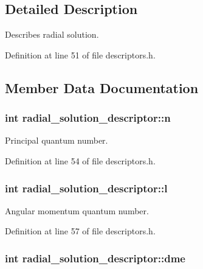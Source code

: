 \subsection{Detailed Description}
Describes radial solution. 

Definition at line 51 of file descriptors.\+h.



\subsection{Member Data Documentation}
\hypertarget{structradial__solution__descriptor_ab0246e8a65be162caf9028b42741c8fd}{}
\subsubsection[{n}]{\setlength{\rightskip}{0pt plus 5cm}int radial\+\_\+solution\+\_\+descriptor\+::n}\label{structradial__solution__descriptor_ab0246e8a65be162caf9028b42741c8fd}


Principal quantum number. 



Definition at line 54 of file descriptors.\+h.

\hypertarget{structradial__solution__descriptor_a006a1f6f6efe200121f1ff1168581828}{}
\subsubsection[{l}]{\setlength{\rightskip}{0pt plus 5cm}int radial\+\_\+solution\+\_\+descriptor\+::l}\label{structradial__solution__descriptor_a006a1f6f6efe200121f1ff1168581828}


Angular momentum quantum number. 



Definition at line 57 of file descriptors.\+h.

\hypertarget{structradial__solution__descriptor_ac07fb38838e782ab8bc1aaf169dd2b3b}{}
\subsubsection[{dme}]{\setlength{\rightskip}{0pt plus 5cm}int radial\+\_\+solution\+\_\+descriptor\+::dme}\label{structradial__solution__descriptor_ac07fb38838e782ab8bc1aaf169dd2b3b}


